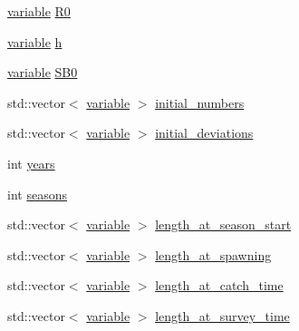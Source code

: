 \begin{DoxyCompactItemize}
\item 
\hyperlink{structmas_1_1_area_population_info_a154b6c5cf71d1241e90b0f0173dbe32c}{variable} \hyperlink{structmas_1_1_area_population_info_a945614eeb02706eb328e2b16e49097f2}{R0}
\item 
\hyperlink{structmas_1_1_area_population_info_a154b6c5cf71d1241e90b0f0173dbe32c}{variable} \hyperlink{structmas_1_1_area_population_info_ad3d38ac9eaa0d47c65aff338751b6246}{h}
\item 
\hyperlink{structmas_1_1_area_population_info_a154b6c5cf71d1241e90b0f0173dbe32c}{variable} \hyperlink{structmas_1_1_area_population_info_a5f549939ff6cb6558b22a6f24da63556}{S\-B0}
\item 
std\-::vector$<$ \hyperlink{structmas_1_1_area_population_info_a154b6c5cf71d1241e90b0f0173dbe32c}{variable} $>$ \hyperlink{structmas_1_1_area_population_info_a15a6fc016fc9c8ec98cf1eaf2e5bde17}{initial\-\_\-numbers}
\item 
std\-::vector$<$ \hyperlink{structmas_1_1_area_population_info_a154b6c5cf71d1241e90b0f0173dbe32c}{variable} $>$ \hyperlink{structmas_1_1_area_population_info_ac172313ebaa727bc964575f00effff02}{initial\-\_\-deviations}
\item 
int \hyperlink{structmas_1_1_area_population_info_a13a36cb1ecbd6fdcae5959989aeb4da9}{years}
\item 
int \hyperlink{structmas_1_1_area_population_info_ac7fc7361c1804c2d24a2c88931c75c0f}{seasons}
\item 
std\-::vector$<$ \hyperlink{structmas_1_1_area_population_info_a154b6c5cf71d1241e90b0f0173dbe32c}{variable} $>$ \hyperlink{structmas_1_1_area_population_info_a481004bc1cd53ff327d50aa8058ca34b}{length\-\_\-at\-\_\-season\-\_\-start}
\item 
std\-::vector$<$ \hyperlink{structmas_1_1_area_population_info_a154b6c5cf71d1241e90b0f0173dbe32c}{variable} $>$ \hyperlink{structmas_1_1_area_population_info_ae61079bdeee2f985c3ec234a33e7c146}{length\-\_\-at\-\_\-spawning}
\item 
std\-::vector$<$ \hyperlink{structmas_1_1_area_population_info_a154b6c5cf71d1241e90b0f0173dbe32c}{variable} $>$ \hyperlink{structmas_1_1_area_population_info_abde813f753a9b255e06476c5d9db5240}{length\-\_\-at\-\_\-catch\-\_\-time}
\item 
std\-::vector$<$ \hyperlink{structmas_1_1_area_population_info_a154b6c5cf71d1241e90b0f0173dbe32c}{variable} $>$ \hyperlink{structmas_1_1_area_population_info_ae8102e517c90423dcf087083da3125e5}{length\-\_\-at\-\_\-survey\-\_\-time}
\item 

\end{DoxyCompactItemize}
